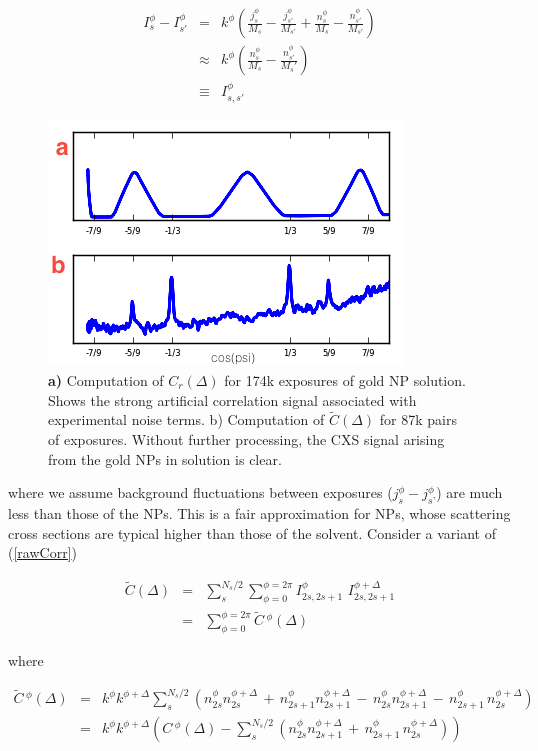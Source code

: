 \documentclass [11pt,fleqn]{article}
\def \beq {\begin{eqnarray}}
\def \eeq {\end{eqnarray}}
\begin{document}
\beq
I_s^\phi - I_{s'}^\phi &=& k^\phi\left( \frac{j_s^\phi}{M_s} - \frac{j_{s'}^\phi}{M_{s'}}  + \frac{n_s^\phi}{M_s} - \frac{n_{s'}^\phi}{M_{s'}} \right) \\
&\approx& k^\phi \left( \frac{n_s^\phi}{M_s} - \frac{n_{s'}^\phi}{M_s'} \right ) \\
&\equiv& I_{s,s'}^\phi
\eeq


\begin{figure}[h]
\begin{center}
\includegraphics[width=\textwidth,height=\textheight,keepaspectratio]{./raw_dif.png}
\end{center}
\caption{\textbf{a)} Computation of $C_r(\Delta)$ for 174k exposures of gold NP solution. Shows the strong artificial correlation signal associated with experimental noise terms. b) Computation of $\tilde{C}(\Delta)$ for 87k pairs of exposures. Without further processing, the CXS signal arising from the gold NPs in solution is clear.}
\label{fig:raw_dif}
\end{figure}

where we assume background fluctuations between exposures ($j_s^\phi - j_{s’}^\phi$) are much less than those of the NPs. This is a fair approximation for NPs, whose scattering cross sections are typical higher than those of the solvent. Consider a variant of (\ref{rawCorr})

\beq \label{cdif}
\tilde{C}(\Delta) &=& \sum _s^{N_s/2} \sum_{\phi=0}^{\phi=2\pi} I_{2s, 2s+1}^\phi\,\, I_{2s,2s+1}^{\phi + \Delta} \\
&=& \sum_{\phi=0}^{\phi=2\pi}  \tilde{C}\,^\phi( \Delta)
\eeq

where

\beq
\tilde{C}\,^\phi(\Delta) &=& k^\phi k^{\phi+\Delta} \sum_s^{N_s/2} \left( n_{2s}^\phi n_{2s}^{\phi+\Delta} \,+\,   n_{2s+1}^\phi n_{2s+1}^{\phi+\Delta} \,-\,  n_{2s}^\phi n_{2s+1}^{\phi+\Delta} \,-\,  n_{2s+1}^\phi\,n_{2s}^{\phi+\Delta} \right)\\
&=& k^\phi k^{\phi+\Delta }\left(  C\,^\phi(\Delta) - \sum_s^{N_s/2} \left ( n_{2s}^\phi n_{2s+1}^{\phi+\Delta} \,+\, n_{2s+1}^\phi\,n_{2s}^{\phi+\Delta}  \right) \right ) 
\eeq
\end{document}
